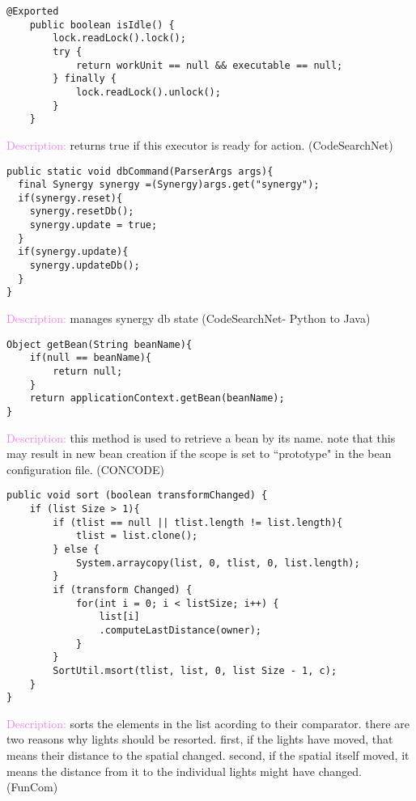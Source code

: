 \documentclass[11pt,a4paper]{article}
\begin{document}
\begin{lstlisting}
@Exported
    public boolean isIdle() {
        lock.readLock().lock();
        try {
            return workUnit == null && executable == null;
        } finally {
            lock.readLock().unlock();
        }
    }
\end{lstlisting}
\vspace{-4pt}
{\small
\textcolor{violet}{Description:} returns true if this executor is ready for action. (CodeSearchNet) \\ 

\singlespacing
}

\begin{lstlisting}
public static void dbCommand(ParserArgs args){
  final Synergy synergy =(Synergy)args.get("synergy");
  if(synergy.reset){
    synergy.resetDb();
    synergy.update = true;
  }
  if(synergy.update){
    synergy.updateDb();
  }
}
\end{lstlisting}
\vspace{-4pt}
{\small
\textcolor{violet}{Description:} manages synergy db state (CodeSearchNet- Python to Java) \\ \singlespacing
}


\begin{lstlisting}
Object getBean(String beanName){ 
	if(null == beanName){ 
		return null; 
	} 
	return applicationContext.getBean(beanName); 
}
\end{lstlisting}
\vspace{-4pt}
{\small
\textcolor{violet}{Description:} this method is used to retrieve a bean by its name. note that this may result in new bean creation if the scope is set to ``prototype" in the bean configuration file. (CONCODE) 
\singlespacing
}


\begin{lstlisting}
public void sort (boolean transformChanged) { 
	if (list Size > 1){ 
		if (tlist == null || tlist.length != list.length){
			tlist = list.clone(); 
		} else { 
			System.arraycopy(list, 0, tlist, 0, list.length); 
		} 
		if (transform Changed) { 
    		for(int i = 0; i < listSize; i++) { 
    		    list[i]
    		    .computeLastDistance(owner); 
    		}
		} 
		SortUtil.msort(tlist, list, 0, list Size - 1, c); 
	} 
}
\end{lstlisting}
\vspace{-4pt}
{\small
\textcolor{violet}{Description:} sorts the elements in the list acording to their comparator. there are two reasons why lights should be resorted. first, if the lights have moved, that means their distance to the spatial changed. second, if the spatial itself moved, it means the distance from it to the individual lights might have changed. (FunCom)
\\ \\ \singlespacing
}


 
\end{document}
